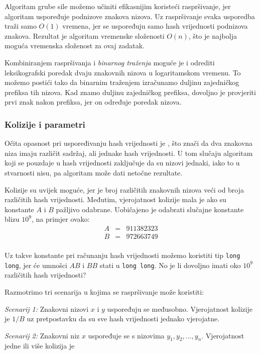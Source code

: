 Algoritam grube sile možemo učiniti efikasnijim
koristeći raspršivanje, jer algoritam uspoređuje
podnizove znakova nizova.
Uz raspršivanje svaka usporedba traži samo $O(1)$ vremena,
jer se uspoređuju samo hash vrijednosti podnizova znakova.
Rezultat je algoritam vremenske složenosti $O(n)$,
što je najbolja moguća vremenska složenost za ovaj zadatak.

Kombiniranjem raspršivanja i \emph{binarnog traženja}
moguće je i odrediti leksikografski poredak
dvaju znakovnih nizova u logaritamskom vremenu.
To možemo postići tako da binarnim traženjem izračunamo duljinu
zajedničkog prefiksa tih nizova.
Kad znamo duljinu zajedničkog prefiksa,
dovoljno je provjeriti prvi znak nakon prefiksa,
jer on određuje poredak nizova.

\subsubsection*{Kolizije i parametri}


Očita opasnost pri uspoređivanju hash vrijednosti je
, što znači da dva znakovna niza imaju
različit sadržaj, ali jednake hash vrijednosti.
U tom slučaju algoritam koji se pouzdaje u
hash vrijednosti zaključuje da su nizovi jednaki,
iako to u stvarnosti nisu,
pa algoritam može dati netočne rezultate.

Kolizije su uvijek moguće,
jer je broj različitih znakovnih nizova veći
od broja različitih hash vrijednosti.
Međutim, vjerojatnost kolizije mala je
ako su konstante $A$ i $B$ pažljivo odabrane.
Uobičajeno je odabrati slučajne konstante
blizu $10^9$, na primjer ovako:
\[
\begin{array}{lcl}
A & = & 911382323 \\
B & = & 972663749 \\
\end{array}
\]

Uz takve konstante
pri računanju hash vrijednosti možemo koristiti
tip \texttt{long long},
jer će umnošci $AB$ i $BB$ stati u \texttt{long long}.
No je li dovoljno imati oko $10^9$ različitih hash vrijednosti?

Razmotrimo tri scenarija u kojima se raspršivanje može koristiti:

\textit{Scenarij 1:} Znakovni nizovi $x$ i $y$ uspoređuju se
međusobno.
Vjerojatnost kolizije je $1/B$ uz pretpostavku da su
sve hash vrijednosti jednako vjerojatne.

\textit{Scenarij 2:} Znakovni niz $x$ uspoređuje se s nizovima
$y_1,y_2,\ldots,y_n$.
Vjerojatnost jedne ili više kolizija je

